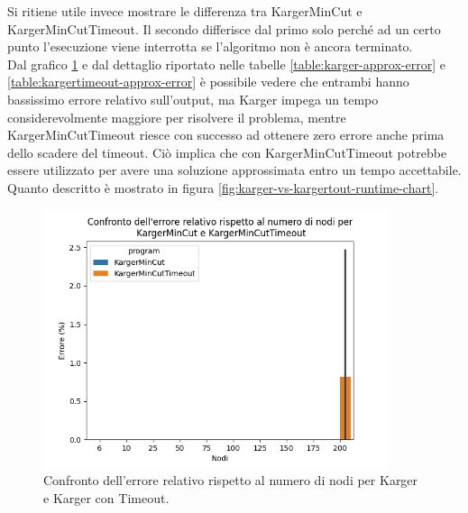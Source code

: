 \noindent Si ritiene utile invece mostrare le differenza tra
KargerMinCut e KargerMinCutTimeout. Il secondo
differisce dal primo solo perché ad un certo punto l'esecuzione viene
interrotta se l'algoritmo non è ancora terminato.\\

\noindent Dal grafico \ref{fig:karger-vs-kargertout-error-chart} e dal
dettaglio riportato nelle tabelle \ref{table:karger-approx-error} e
\ref{table:kargertimeout-approx-error} è possibile vedere che entrambi
hanno bassissimo errore relativo sull'output, ma Karger impega un
tempo considerevolmente maggiore per risolvere il problema, mentre
KargerMinCutTimeout riesce con successo ad ottenere zero errore anche
prima dello scadere del timeout. Ciò implica che con
KargerMinCutTimeout potrebbe essere utilizzato per avere una soluzione
approssimata entro un tempo accettabile. Quanto descritto è mostrato
in figura \ref{fig:karger-vs-kargertout-runtime-chart}.

\begin{figure}[H]
    \centering

    \includegraphics[width=0.9\textwidth]{./images/Confronto_dell'errore_relativo_rispetto_al_numero_di_nodi_per__KargerMinCut_e_KargerMinCutTimeout.png}

    \caption{Confronto dell'errore relativo rispetto al numero di nodi per Karger e Karger con Timeout.}
    \label{fig:karger-vs-kargertout-error-chart}
\end{figure}

